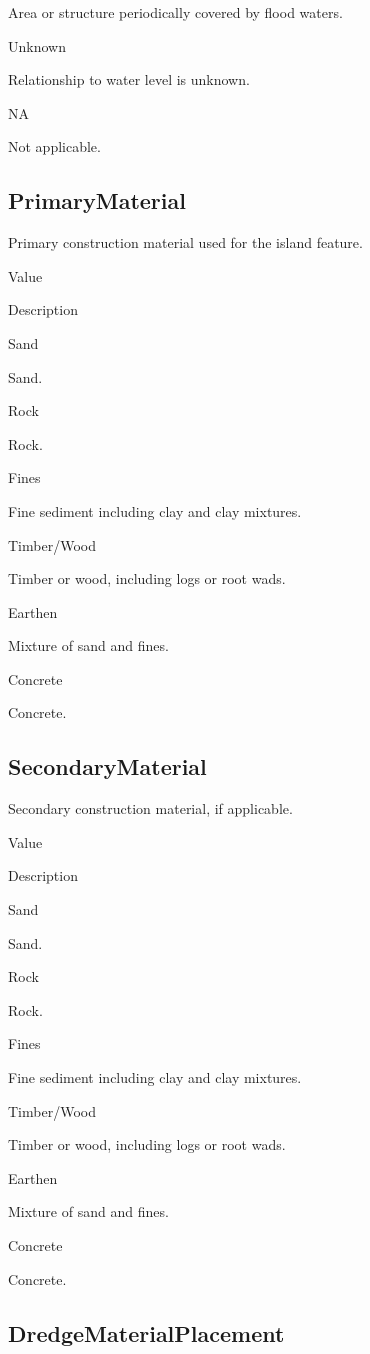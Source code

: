 \documentclass[
  letterpaper,
  DIV=11,
  numbers=noendperiod]{scrreprt}
\begin{document}
Area or structure periodically covered by flood waters.

Unknown

Relationship to water level is unknown.

NA

Not applicable.

\subsection{PrimaryMaterial}\label{primarymaterial}

Primary construction material used for the island feature.

Value

Description

Sand

Sand.

Rock

Rock.

Fines

Fine sediment including clay and clay mixtures.

Timber/Wood

Timber or wood, including logs or root wads.

Earthen

Mixture of sand and fines.

Concrete

Concrete.

\subsection{SecondaryMaterial}\label{secondarymaterial}

Secondary construction material, if applicable.

Value

Description

Sand

Sand.

Rock

Rock.

Fines

Fine sediment including clay and clay mixtures.

Timber/Wood

Timber or wood, including logs or root wads.

Earthen

Mixture of sand and fines.

Concrete

Concrete.

\subsection{DredgeMaterialPlacement}\label{dredgematerialplacement}
\end{document}
